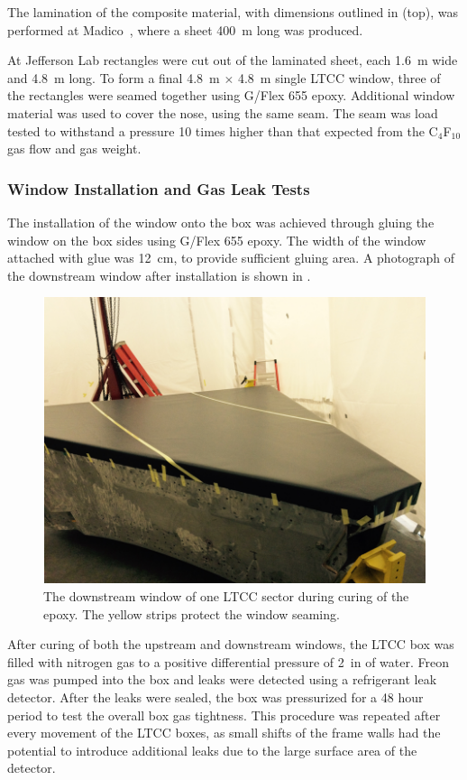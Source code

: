 The lamination of the composite material, with dimensions outlined in  (top), was performed at
Madico~\cite{madico}, where a sheet 400~m long was produced.

At Jefferson Lab rectangles were cut out of the laminated sheet, each 1.6~m wide and 4.8~m long. To form a final
4.8~m $\times$ 4.8~m single LTCC window, three of the rectangles were seamed together using G/Flex 655 epoxy.
Additional window material was used to cover the nose, using the same seam.
The seam was load tested to withstand a pressure 10 times higher than that
expected from the C$_4$F$_{10}$ gas flow and gas weight.

\subsubsection{Window Installation and Gas Leak Tests}

The installation of the window onto the box was achieved through gluing the window on the box sides using G/Flex 655
epoxy. The width of the window attached with glue was 12~cm, to provide sufficient gluing area. A photograph of the
downstream window after installation is shown in .

\begin{figure}
	\centering
	\includegraphics[width=1.0\columnwidth,keepaspectratio]{img/downstreamWindow.png}
	\caption{The downstream window of one LTCC sector during curing of the epoxy. The yellow strips protect the
          window seaming.}
	\label{fig:downstreamWindow}
\end{figure}

After curing of both the upstream and downstream windows, the LTCC box was filled with nitrogen gas to a
positive differential pressure of
2~in of water. Freon gas was pumped into the box and leaks were detected using a refrigerant leak detector. After the
leaks were sealed, the box was pressurized for a 48 hour period to test the overall box gas tightness. This procedure
was repeated after every movement of the LTCC boxes, as small shifts of the frame walls had the potential to introduce
additional leaks due to the large surface area of the detector.
